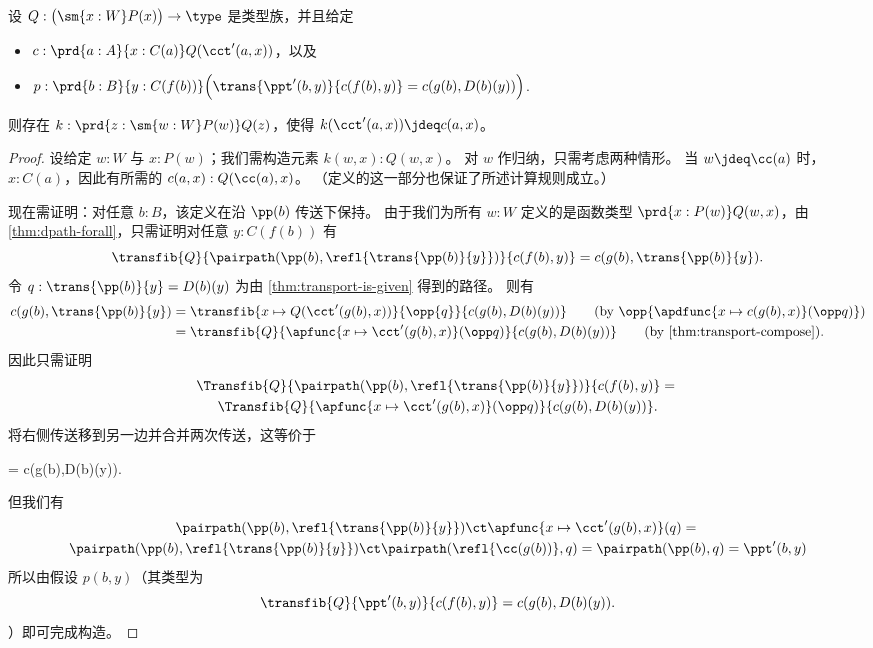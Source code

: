 \begin{lem}\label{thm:flattening-rect}
  设 $Q:\big(\sm{x:W} P(x)\big) \to \type$ 是类型族，并且给定
  \begin{itemize}
  \item $c : \prd{a:A}{x:C(a)} Q(\cct'(a,x))$，以及
  \item $p : \prd{b:B}{y:C(f(b))} \Big(\trans{\ppt'(b,y)}{c(f(b),y)} = c(g(b),D(b)(y))\Big)$. %
  \end{itemize}
  则存在 $k:\prd{z:\sm{w:W} P(w)} Q(z)$，使得 $k(\cct'(a,x)) \jdeq c(a,x)$。
\end{lem}
\begin{proof}
  设给定 $w:W$ 与 $x:P(w)$；我们需构造元素 $k(w,x):Q(w,x)$。
  对 $w$ 作归纳，只需考虑两种情形。
  当 $w\jdeq \cc(a)$ 时，$x:C(a)$，因此有所需的 $c(a,x):Q(\cc(a),x)$。
  （定义的这一部分也保证了所述计算规则成立。）

  现在需证明：对任意 $b:B$，该定义在沿 $\pp(b)$ 传送下保持。
  由于我们为所有 $w:W$ 定义的是函数类型 $\prd{x:P(w)} Q(w,x)$，由 \cref{thm:dpath-forall}，只需证明对任意 $y:C(f(b))$ 有
  \[ \transfib{Q}{\pairpath(\pp(b),\refl{\trans{\pp(b)}{y}})}{c(f(b),y)} = c(g(b),\trans{\pp(b)}{y}). \]
  令 $q:\trans{\pp(b)}{y} = D(b)(y)$ 为由 \cref{thm:transport-is-given} 得到的路径。
  则有
  \begin{align}
    c(g(b),\trans{\pp(b)}{y})
    &= \transfib{x\mapsto Q(\cct'(g(b),x))}{\opp{q}}{c(g(b),D(b)(y))}
    \tag{by $\opp{\apdfunc{x\mapsto c(g(b),x)}(\opp q)}$} \\
    &= \transfib{Q}{\apfunc{x\mapsto \cct'(g(b),x)}(\opp q)}{c(g(b),D(b)(y))}
    \tag{by \cref{thm:transport-compose}}.
  \end{align}
  因此只需证明
  \begin{multline*}
    \Transfib{Q}{\pairpath(\pp(b),\refl{\trans{\pp(b)}{y}})}{c(f(b),y)} = {}\\
    \Transfib{Q}{\apfunc{x\mapsto \cct'(g(b),x)}(\opp q)}{c(g(b),D(b)(y))}.
  \end{multline*}
  将右侧传送移到另一边并合并两次传送，这等价于
  \begin{narrowmultline*}
     =
    \narrowbreak
    c(g(b),D(b)(y)).
  \end{narrowmultline*}
  但我们有
  \begin{multline*}
    \pairpath(\pp(b),\refl{\trans{\pp(b)}{y}}) \ct \apfunc{x\mapsto \cct'(g(b),x)}(q)
    = {} \\
    \pairpath(\pp(b),\refl{\trans{\pp(b)}{y}}) \ct \pairpath(\refl{\cc(g(b))},q)
    = \pairpath(\pp(b),q)
    = \ppt'(b,y)
  \end{multline*}
  所以由假设 $p(b,y)$（其类型为
  \[ \transfib{Q}{\ppt'(b,y)}{c(f(b),y)} = c(g(b),D(b)(y)). \qedhere \]
  ）即可完成构造。
\end{proof}

